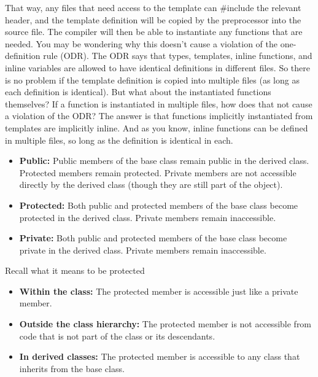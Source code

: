 \documentclass{report}
\begin{document}
\bigbreak \noindent 
That way, any files that need access to the template can #include the relevant header, and the template definition will be copied by the preprocessor into the source file. The compiler will then be able to instantiate any functions that are needed.
\bigbreak \noindent 
You may be wondering why this doesn’t cause a violation of the one-definition rule (ODR). The ODR says that types, templates, inline functions, and inline variables are allowed to have identical definitions in different files. So there is no problem if the template definition is copied into multiple files (as long as each definition is identical).
\bigbreak \noindent 
But what about the instantiated functions themselves? If a function is instantiated in multiple files, how does that not cause a violation of the ODR? The answer is that functions implicitly instantiated from templates are implicitly inline. And as you know, inline functions can be defined in multiple files, so long as the definition is identical in each.

\pagebreak 
{}
\bigbreak \noindent 
\begin{itemize}
    \item \textbf{Public:} Public members of the base class remain public in the derived class.
        \bigbreak \noindent 
        Protected members remain protected.
        \bigbreak \noindent 
        Private members are not accessible directly by the derived class (though they are still part of the object).
    \item \textbf{Protected:}
        Both public and protected members of the base class become protected in the derived class.
        \bigbreak \noindent 
        Private members remain inaccessible.
    \item \textbf{Private:}
        Both public and protected members of the base class become private in the derived class.
        \bigbreak \noindent 
        Private members remain inaccessible.
\end{itemize}
\bigbreak \noindent 
Recall what it means to be protected
\begin{itemize}
    \item \textbf{Within the class:} The protected member is accessible just like a private member.
    \item \textbf{Outside the class hierarchy:} The protected member is not accessible from code that is not part of the class or its descendants.
    \item \textbf{In derived classes:} The protected member is accessible to any class that inherits from the base class.
\end{itemize}
\end{document}
